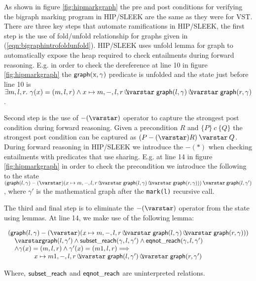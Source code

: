As shown in figure \ref{fig:hipmarkgraph} the pre and post conditions for verifying the bigraph marking program in HIP/SLEEK are the same as they were for VST. There are three key steps that automate ramifications in HIP/SLEEK, the first step is the use of fold/unfold relationship for graphs given in (\ref{eqn:bigraphintrofoldunfold}). HIP/SLEEK uses unfold lemma for graph to automatically expose the heap required to check entailments during forward reasoning. E.g. in order to check the dereference at line 10 in figure \ref{fig:hipmarkgraph} the $\mathsf{graph}(\text{x},\gamma)$ predicate is unfolded and the state just before line 10 is $ \exists m,l,r.~ \gamma(x)=(m,l,r) \wedge x \mapsto m,-,l,r \ocon \p{graph}(l, \gamma) \ocon \p{graph}(r, \gamma)$.

Second step is the use of $-(\scon)$ operator to capture the strongest post condition during forward reasoning. Given a precondition $R$ and $\{P\}~c~\{Q\}$ the strongest post condition can be captured as $(P -(\scon) R) \scon Q$. During forward reasoning in HIP/SLEEK we introduce the $-(*)$ when checking entailments with predicates that use sharing. E.g. at line 14 in figure \ref{fig:hipmarkgraph} in order to check the precondition we introduce the following to the state $ (\p{graph}(l, \gamma) -(\scon) (x \mapsto m,-,l,r \ocon \p{graph}(l, \gamma) \ocon \p{graph}(r, \gamma))) \scon \p{graph}(l, \gamma')$, where $\gamma'$ is the mathematical graph after the \texttt{mark(l)} recursive call.

The third and final step is to eliminate the $-(\scon)$ operator from the state using lemmas. At line 14, we make use of the following lemma:

\[
\begin{array}{l}
(\p{graph}(l, \gamma) -(\scon) (x \mapsto m,-,l,r \ocon \p{graph}(l, \gamma) \ocon \p{graph}(r, \gamma))) \\
\quad \scon \p{graph}(l, \gamma') \wedge \p{subset\_reach}(\gamma,l,\gamma') \wedge \p{eqnot\_reach}(\gamma,l,\gamma') \\
\quad \wedge  \gamma(x)=(m,l,r) \wedge \gamma'(x)=(m1,l,r) ==> \\
\qquad \qquad x \mapsto m1,-,l,r \ocon \p{graph}(l, \gamma') \ocon \p{graph}(r, \gamma')
\end{array}
\]

Where, $\mathsf{subset\_reach}$ and $\mathsf{eqnot\_reach}$ are uninterpreted relations.
